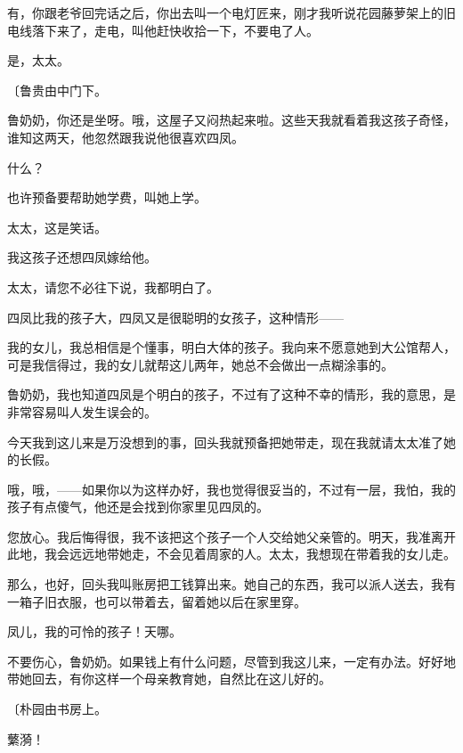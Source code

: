 有，你跟老爷回完话之后，你出去叫一个电灯匠来，刚才我听说花园藤萝架上的旧电线落下来了，走电，叫他赶快收拾一下，不要电了人。

是，太太。

{\fangsong〔鲁贵由中门下。}

鲁奶奶，你还是坐呀。哦，这屋子又闷热起来啦。这些天我就看着我这孩子奇怪，谁知这两天，他忽然跟我说他很喜欢四凤。

什么？

也许预备要帮助她学费，叫她上学。

太太，这是笑话。

我这孩子还想四凤嫁给他。

太太，请您不必往下说，我都明白了。

四凤比我的孩子大，四凤又是很聪明的女孩子，这种情形——

我的女儿，我总相信是个懂事，明白大体的孩子。我向来不愿意她到大公馆帮人，可是我信得过，我的女儿就帮这儿两年，她总不会做出一点糊涂事的。

鲁奶奶，我也知道四凤是个明白的孩子，不过有了这种不幸的情形，我的意思，是非常容易叫人发生误会的。

今天我到这儿来是万没想到的事，回头我就预备把她带走，现在我就请太太准了她的长假。

哦，哦，——如果你以为这样办好，我也觉得很妥当的，不过有一层，我怕，我的孩子有点傻气，他还是会找到你家里见四凤的。

您放心。我后悔得很，我不该把这个孩子一个人交给她父亲管的。明天，我准离开此地，我会远远地带她走，不会见着周家的人。太太，我想现在带着我的女儿走。

那么，也好，回头我叫账房把工钱算出来。她自己的东西，我可以派人送去，我有一箱子旧衣服，也可以带着去，留着她以后在家里穿。

凤儿，我的可怜的孩子！天哪。

不要伤心，鲁奶奶。如果钱上有什么问题，尽管到我这儿来，一定有办法。好好地带她回去，有你这样一个母亲教育她，自然比在这儿好的。

{\fangsong〔朴园由书房上。}

蘩漪！

